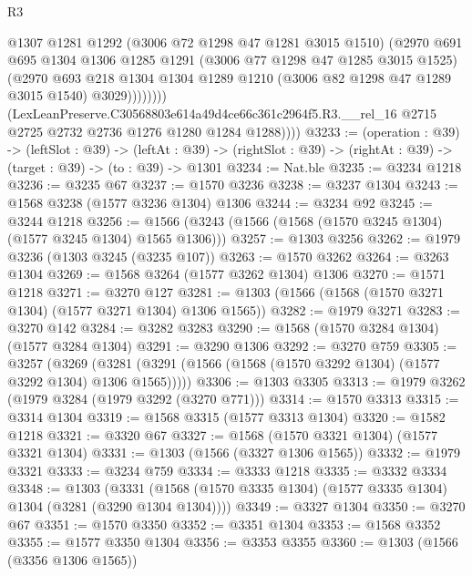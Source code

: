 \begin{lexlean}{R3}
\begin{coremodule}
                      @1307
                      @1281
                      @1292
                      (@3006 @72 @1298 @47 @1281 @3015 @1510)
                      (@2970
                        @691
                        @695
                        @1304
                        @1306
                        @1285
                        @1291
                        (@3006 @77 @1298 @47 @1285 @3015 @1525)
                        (@2970
                          @693
                          @218
                          @1304
                          @1304
                          @1289
                          @1210
                          (@3006 @82 @1298 @47 @1289 @3015 @1540)
                          @3029))))))))
          (LexLeanPreserve.C30568803e614a49d4ce66c361c2964f5.R3.__rel_16
            @2715
            @2725
            @2732
            @2736
            @1276
            @1280
            @1284
            @1288))))
@3233 := (operation : @39) ->
  (leftSlot : @39) ->
  (leftAt : @39) -> (rightSlot : @39) -> (rightAt : @39) -> (target : @39) -> (to : @39) -> @1301
@3234 := Nat.ble
@3235 := @3234 @1218
@3236 := @3235 @67
@3237 := @1570 @3236
@3238 := @3237 @1304
@3243 := @1568 @3238 (@1577 @3236 @1304) @1306
@3244 := @3234 @92
@3245 := @3244 @1218
@3256 := @1566 (@3243 (@1566 (@1568 (@1570 @3245 @1304) (@1577 @3245 @1304) @1565 @1306)))
@3257 := @1303 @3256
@3262 := @1979 @3236 (@1303 @3245 (@3235 @107))
@3263 := @1570 @3262
@3264 := @3263 @1304
@3269 := @1568 @3264 (@1577 @3262 @1304) @1306
@3270 := @1571 @1218
@3271 := @3270 @127
@3281 := @1303 (@1566 (@1568 (@1570 @3271 @1304) (@1577 @3271 @1304) @1306 @1565))
@3282 := @1979 @3271
@3283 := @3270 @142
@3284 := @3282 @3283
@3290 := @1568 (@1570 @3284 @1304) (@1577 @3284 @1304)
@3291 := @3290 @1306
@3292 := @3270 @759
@3305 := @3257
    (@3269 (@3281 (@3291 (@1566 (@1568 (@1570 @3292 @1304) (@1577 @3292 @1304) @1306 @1565)))))
@3306 := @1303 @3305
@3313 := @1979 @3262 (@1979 @3284 (@1979 @3292 (@3270 @771)))
@3314 := @1570 @3313
@3315 := @3314 @1304
@3319 := @1568 @3315 (@1577 @3313 @1304)
@3320 := @1582 @1218
@3321 := @3320 @67
@3327 := @1568 (@1570 @3321 @1304) (@1577 @3321 @1304)
@3331 := @1303 (@1566 (@3327 @1306 @1565))
@3332 := @1979 @3321
@3333 := @3234 @759
@3334 := @3333 @1218
@3335 := @3332 @3334
@3348 := @1303
    (@3331 (@1568 (@1570 @3335 @1304) (@1577 @3335 @1304) @1304 (@3281 (@3290 @1304 @1304))))
@3349 := @3327 @1304
@3350 := @3270 @67
@3351 := @1570 @3350
@3352 := @3351 @1304
@3353 := @1568 @3352
@3355 := @1577 @3350 @1304
@3356 := @3353 @3355
@3360 := @1303 (@1566 (@3356 @1306 @1565))

\end{coremodule}
\end{lexlean}
